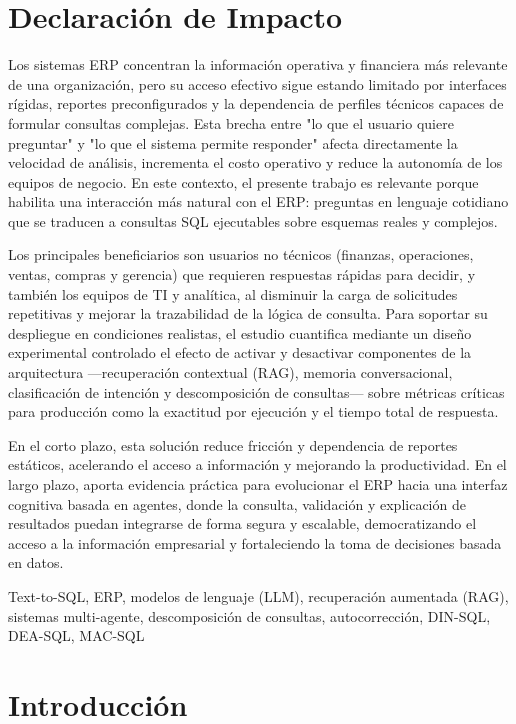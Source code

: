 \documentclass[journal]{IEEEtran}
\begin{document}
\section*{Declaración de Impacto}

Los sistemas ERP concentran la información operativa y financiera más relevante de una organización, pero su acceso efectivo sigue estando limitado por interfaces rígidas, reportes preconfigurados y la dependencia de perfiles técnicos capaces de formular consultas complejas. Esta brecha entre "lo que el usuario quiere preguntar" y "lo que el sistema permite responder" afecta directamente la velocidad de análisis, incrementa el costo operativo y reduce la autonomía de los equipos de negocio. En este contexto, el presente trabajo es relevante porque habilita una interacción más natural con el ERP: preguntas en lenguaje cotidiano que se traducen a consultas SQL ejecutables sobre esquemas reales y complejos.

Los principales beneficiarios son usuarios no técnicos (finanzas, operaciones, ventas, compras y gerencia) que requieren respuestas rápidas para decidir, y también los equipos de TI y analítica, al disminuir la carga de solicitudes repetitivas y mejorar la trazabilidad de la lógica de consulta. Para soportar su despliegue en condiciones realistas, el estudio cuantifica mediante un diseño experimental controlado el efecto de activar y desactivar componentes de la arquitectura —recuperación contextual (RAG), memoria conversacional, clasificación de intención y descomposición de consultas— sobre métricas críticas para producción como la exactitud por ejecución y el tiempo total de respuesta.

En el corto plazo, esta solución reduce fricción y dependencia de reportes estáticos, acelerando el acceso a información y mejorando la productividad. En el largo plazo, aporta evidencia práctica para evolucionar el ERP hacia una interfaz cognitiva basada en agentes, donde la consulta, validación y explicación de resultados puedan integrarse de forma segura y escalable, democratizando el acceso a la información empresarial y fortaleciendo la toma de decisiones basada en datos.

\begin{IEEEkeywords}
	Text-to-SQL, ERP, modelos de lenguaje (LLM), recuperación aumentada (RAG), sistemas multi-agente, descomposición de consultas, autocorrección, DIN-SQL, DEA-SQL, MAC-SQL
\end{IEEEkeywords}

\section{Introducción}
\end{document}
